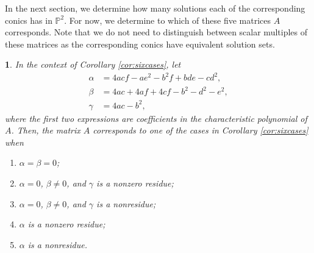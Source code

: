 \documentclass[10pt,a4paper]{amsart}
\numberwithin{equation}{section}
\numberwithin{figure}{section}
\numberwithin{table}{section}
\theoremstyle{definition}
\theoremstyle{plain}
\theoremstyle{remark}
\theoremstyle{plain}
\theoremstyle{definition}
\theoremstyle{plain}
\theoremstyle{plain}
\newtheorem{lem}[thm]{\protect\lemmaname}
\providecommand{\lemmaname}{Lemma}
\renewcommand{\P}{\mathbb{P}}
\begin{document}
	In the next section, we determine how many solutions each of the corresponding conics has in $\P^2$. For now, we determine to which of these five matrices $A$ corresponds. Note that we do not need to distinguish between scalar multiples of these matrices as the corresponding conics have equivalent solution sets.
	
	\begin{lem}
		\label{thm:diag-P2}
		In the context of Corollary \ref{cor:sixcases}, let
		\begin{align*}
		\alpha &= 4acf - ae^2 - b^2f + bde - cd^2,\\
		\beta &= 4ac + 4af + 4cf - b^2 - d^2 - e^2, \\
		\gamma &= 4ac - b^2,
		\end{align*} 
		where the first two expressions are coefficients in the 
		characteristic polynomial of $A$. 
		Then, the matrix $A$ corresponds to one of the cases in 
		Corollary \ref{cor:sixcases} when
		\begin{enumerate}
			\item\label{case:1} $\alpha=\beta=0$;
			\item\label{case:11} $\alpha=0$, $\beta\ne 0$, 
			and $\gamma$ is a nonzero residue;
			\item\label{case:1r} $\alpha=0$, $\beta\ne 0$, 
			and $\gamma$ is a nonresidue;
			\item\label{case:111} $\alpha$ is a nonzero residue;
			\item\label{case:11r} $\alpha$ is a nonresidue.
		\end{enumerate}
	\end{lem}
\end{document}
